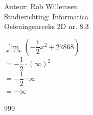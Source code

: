 \documentclass[a4paper]{article}
\begin{document}
\noindent \large Auteur: Rob Willemsen \\
\noindent \large Studierichting: Informatica\\
\noindent \large Oefeningenreeks 2D nr. 8.3\\

\medskip

\normalsize

$\lim\limits_{x \rightarrow \infty} ( -\dfrac{1}{2}x^2 + 27868)$ \\

$= -\dfrac{1}{2} \cdot (\infty)^2$ \\

$= -\dfrac{1}{2} \cdot \infty$ \\

$= -\infty$ \\

\begin{thebibliography}{999}
\end{thebibliography}
\end{document}
